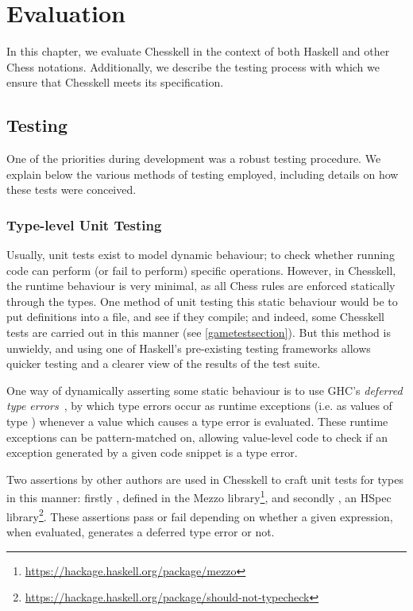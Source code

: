 \chapter{Evaluation}

In this chapter, we evaluate Chesskell in the context of both Haskell and other Chess notations. Additionally, we describe the testing process with which we ensure that Chesskell meets its specification.

\section{Testing} \label{testsection}

One of the priorities during development was a robust testing procedure. We explain below the various methods of testing employed, including details on how these tests were conceived.

\subsection{Type-level Unit Testing} \label{reflsection}

Usually, unit tests exist to model dynamic behaviour; to check whether running code can perform (or fail to perform) specific operations. However, in Chesskell, the runtime behaviour is very minimal, as all Chess rules are enforced statically through the types. One method of unit testing this static behaviour would be to put definitions into a file, and see if they compile; and indeed, some Chesskell tests are carried out in this manner (see \cref{gametestsection}). But this method is unwieldy, and using one of Haskell's pre-existing testing frameworks allows quicker testing and a clearer view of the results of the test suite.

One way of dynamically asserting some static behaviour is to use GHC's \emph{deferred type errors}~\cite{deferredtypeerrors}, by which type errors occur as runtime exceptions (i.e. as values of type ) whenever a value which causes a type error is evaluated. These runtime exceptions can be pattern-matched on, allowing value-level code to check if an exception generated by a given code snippet is a type error.

Two assertions by other authors are used in Chesskell to craft unit tests for types in this manner: firstly , defined in the Mezzo library\footnote{\url{https://hackage.haskell.org/package/mezzo}}, and secondly , an HSpec library\footnote{\url{https://hackage.haskell.org/package/should-not-typecheck}}. These assertions pass or fail depending on whether a given expression, when evaluated, generates a deferred type error or not.

